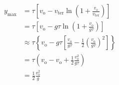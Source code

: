 \documentclass{article}
\begin{document}
\begin{enumerate}
        \begin{align*}
          y_\text{max} & = \tau \left[ v_\text{o} - v_\text{ter} \ln \left( 1 + \frac{v_\text{o}}{v_\text{ter}} \right) \right]                                              \\
                       & = \tau \left[ v_\text{o} - g \tau \ln \left( 1 + \frac{v_\text{o}}{g \tau} \right) \right]                                                          \\
                       & \approx \tau \left\{ v_\text{o} - g \tau \left[ \frac{v_\text{o}}{g \tau} - \frac{1}{2} \left( \frac{v_\text{o}}{g \tau} \right)^2 \right] \right\} \\
                       & = \tau \left( v_\text{o} - v_\text{o} + \frac{1}{2} \frac{v_\text{o}^2}{g \tau} \right)                                                             \\
                       & = \frac{1}{2} \frac{v_\text{o}^2}{g}
        \end{align*}
\end{enumerate}

\setcounter{subsection}{12}
\subsection{}
\end{document}
